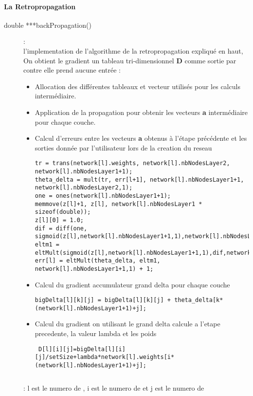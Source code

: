 \paragraph{La Retropropagation }
\begin{description}
\item[{double ***backPropagation()}]:\\ l'implementation de l'algorithme de la retropropagation expliqué en haut, On obtient le gradient un tableau tri-dimensionnel \textbf{D} comme sortie par contre elle prend aucune entrée :
\begin{itemize}
\item Allocation des différentes tableaux et vecteur utilisés pour les calculs intermédiaire.
\item Application de la propagation pour obtenir les vecteurs \textbf{a} intermédiaire pour chaque couche.
\item Calcul d'erreurs entre les vecteurs \textbf{a} obtenus à l'étape précédente et les sorties donnée par l'utilisateur lors de la creation du reseau
\begin{verbatim}
tr = trans(network[l].weights, network[l].nbNodesLayer2, network[l].nbNodesLayer1+1);
theta_delta = mult(tr, err[l+1], network[l].nbNodesLayer1+1, network[l].nbNodesLayer2,1);
one = ones(network[l].nbNodesLayer1+1);
memmove(z[l]+1, z[l], network[l].nbNodesLayer1 * sizeof(double));
z[l][0] = 1.0;
dif = diff(one, sigmoid(z[l],network[l].nbNodesLayer1+1,1),network[l].nbNodesLayer1+1,1);
eltm1 = eltMult(sigmoid(z[l],network[l].nbNodesLayer1+1,1),dif,network[l].nbNodesLayer1+1,1);
err[l] = eltMult(theta_delta, eltm1, network[l].nbNodesLayer1+1,1) + 1;
\end{verbatim}
\item Calcul du gradient accumulateur grand delta pour chaque couche

\begin{verbatim}
bigDelta[l][k][j] = bigDelta[l][k][j] + theta_delta[k*(network[l].nbNodesLayer1+1)+j];
\end{verbatim}
\item Calcul du gradient on utilisant le grand delta calcule a l'etape precedente, la valeur lambda et les poids
\begin{verbatim}
 D[l][i][j]=bigDelta[l][i][j]/setSize+lambda*network[l].weights[i*(network[l].nbNodesLayer1+1)+j];
\end{verbatim}
\end{itemize}
\begin{verbatim}

\end{verbatim}
 : l est le numero de , i est le numero de et j est le numero de
\end{description}

